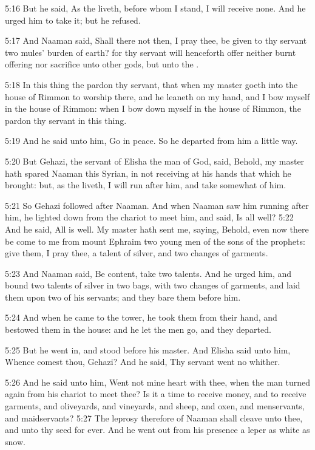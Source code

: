 5:16 But he said, As the \LORD liveth, before whom I stand, I will receive none. And he urged him to take it; but he refused.

5:17 And Naaman said, Shall there not then, I pray thee, be given to thy servant two mules' burden of earth? for thy servant will henceforth offer neither burnt offering nor sacrifice unto other gods, but unto the \LORD.

5:18 In this thing the \LORD pardon thy servant, that when my master goeth into the house of Rimmon to worship there, and he leaneth on my hand, and I bow myself in the house of Rimmon: when I bow down myself in the house of Rimmon, the \LORD pardon thy servant in this thing.

5:19 And he said unto him, Go in peace. So he departed from him a little way.

5:20 But Gehazi, the servant of Elisha the man of God, said, Behold, my master hath spared Naaman this Syrian, in not receiving at his hands that which he brought: but, as the \LORD liveth, I will run after him, and take somewhat of him.

5:21 So Gehazi followed after Naaman. And when Naaman saw him running after him, he lighted down from the chariot to meet him, and said, Is all well?  5:22 And he said, All is well. My master hath sent me, saying, Behold, even now there be come to me from mount Ephraim two young men of the sons of the prophets: give them, I pray thee, a talent of silver, and two changes of garments.

5:23 And Naaman said, Be content, take two talents. And he urged him, and bound two talents of silver in two bags, with two changes of garments, and laid them upon two of his servants; and they bare them before him.

5:24 And when he came to the tower, he took them from their hand, and bestowed them in the house: and he let the men go, and they departed.

5:25 But he went in, and stood before his master. And Elisha said unto him, Whence comest thou, Gehazi? And he said, Thy servant went no whither.

5:26 And he said unto him, Went not mine heart with thee, when the man turned again from his chariot to meet thee? Is it a time to receive money, and to receive garments, and oliveyards, and vineyards, and sheep, and oxen, and menservants, and maidservants?  5:27 The leprosy therefore of Naaman shall cleave unto thee, and unto thy seed for ever. And he went out from his presence a leper as white as snow.

